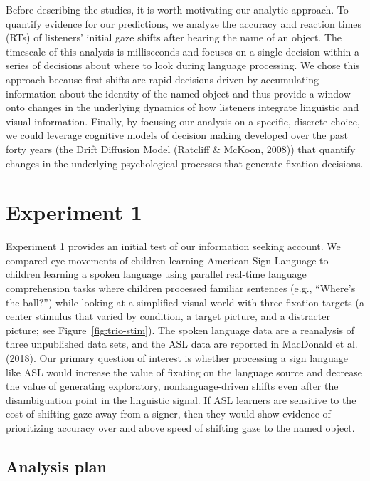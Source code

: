 \documentclass[english,floatsintext,man]{apa6}
\begin{document}
Before describing the studies, it is worth motivating our analytic
approach. To quantify evidence for our predictions, we analyze the
accuracy and reaction times (RTs) of listeners' initial gaze shifts
after hearing the name of an object. The timescale of this analysis is
milliseconds and focuses on a single decision within a series of
decisions about where to look during language processing. We chose this
approach because first shifts are rapid decisions driven by accumulating
information about the identity of the named object and thus provide a
window onto changes in the underlying dynamics of how listeners
integrate linguistic and visual information. Finally, by focusing our
analysis on a specific, discrete choice, we could leverage cognitive
models of decision making developed over the past forty years (the Drift
Diffusion Model (Ratcliff \& McKoon, 2008)) that quantify changes in the
underlying psychological processes that generate fixation decisions.

\hypertarget{experiment-1}{%
\section{Experiment 1}\label{experiment-1}}

Experiment 1 provides an initial test of our information seeking
account. We compared eye movements of children learning American Sign
Language to children learning a spoken language using parallel real-time
language comprehension tasks where children processed familiar sentences
(e.g., \enquote{Where's the ball?}) while looking at a simplified visual
world with three fixation targets (a center stimulus that varied by
condition, a target picture, and a distracter picture; see
Figure~\ref{fig:trio-stim}). The spoken language data are a reanalysis
of three unpublished data sets, and the ASL data are reported in
MacDonald et al. (2018). Our primary question of interest is whether
processing a sign language like ASL would increase the value of fixating
on the language source and decrease the value of generating exploratory,
nonlanguage-driven shifts even after the disambiguation point in the
linguistic signal. If ASL learners are sensitive to the cost of shifting
gaze away from a signer, then they would show evidence of prioritizing
accuracy over and above speed of shifting gaze to the named object.

\hypertarget{analysis-plan}{%
\subsection{Analysis plan}\label{analysis-plan}}
\end{document}
